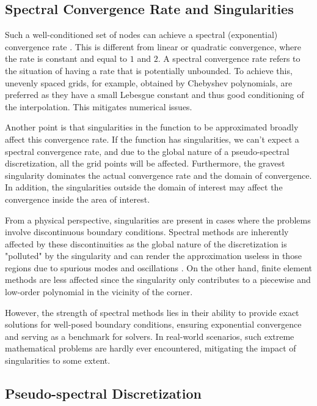 \subsection{Spectral Convergence Rate and Singularities}

Such a well-conditioned set of nodes can achieve a spectral (exponential)
convergence rate \citep{meseguer2020}. This is different from linear or
quadratic convergence, where the rate is constant and equal to $1$ and $2$. A
spectral convergence rate refers to the situation of having a rate that is
potentially unbounded. To achieve this, unevenly spaced grids, for example,
obtained by Chebyshev polynomials, are preferred as they have a small Lebesgue
constant and thus good conditioning of the interpolation. This mitigates
numerical issues. 

Another point is that singularities in the function to be approximated broadly
affect this convergence rate. If the function has singularities, we can't
expect a spectral convergence rate, and due to the global nature of a
pseudo-spectral discretization, all the grid points will be affected.
Furthermore, the gravest singularity dominates the actual convergence rate and
the domain of convergence. In addition, the singularities outside the domain of
interest may affect the convergence inside the area of interest. 

From a physical perspective, singularities are present in cases where the
problems involve discontinuous boundary conditions. Spectral methods are
inherently affected by these discontinuities as the global nature of the
discretization is "polluted" by the singularity and can render the
approximation useless in those regions due to spurious modes and oscillations
\citep{canuto2006}. On the other hand, finite element methods are less affected
since the singularity only contributes to a piecewise and low-order polynomial
in the vicinity of the corner.

However, the strength of spectral methods lies in their ability to provide
exact solutions for well-posed boundary conditions, ensuring exponential
convergence and serving as a benchmark for solvers. In real-world scenarios,
such extreme mathematical problems are hardly ever encountered, mitigating the
impact of singularities to some extent.

\subsection{Pseudo-spectral Discretization}

